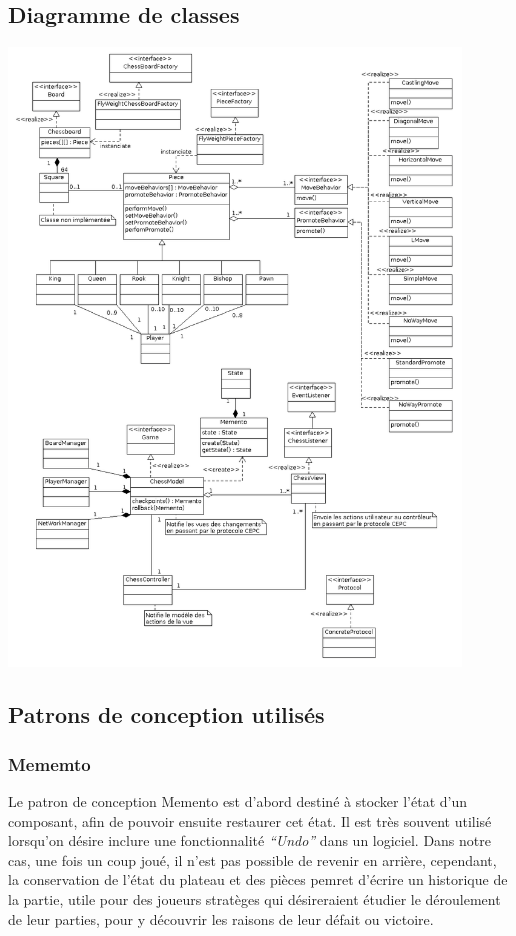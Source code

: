 \documentclass[11pt]{article}
\begin{document}
\subsection{Diagramme de classes}
\label{sec-3-2}
\includegraphics[width=0.9\textwidth]{Diagrammedeclasses.png}

\subsection{Patrons de conception utilisés}
\label{sec-3-3}
\subsubsection{Mememto}
\label{sec-3-3-1}
Le patron de conception Memento est d'abord destiné à stocker l'état d'un composant, afin de pouvoir ensuite restaurer cet état. Il est très souvent utilisé lorsqu'on désire inclure une fonctionnalité \emph{``Undo''} dans un logiciel. Dans notre cas, une fois un coup joué, il n'est pas possible de revenir en arrière, cependant, la conservation de l'état du plateau et des pièces pemret d'écrire un historique de la partie, utile pour des joueurs stratèges qui désireraient étudier le déroulement de leur parties, pour y découvrir les raisons de leur défait ou victoire.
\end{document}
